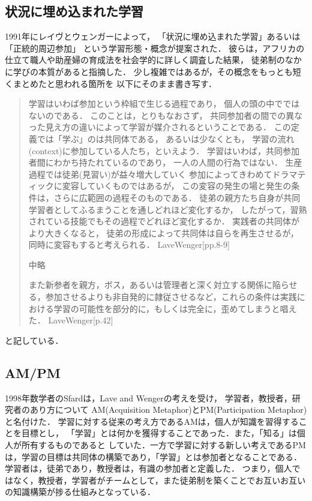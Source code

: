 \documentclass[a4,p11]{article}
\begin{document}
\subsection{状況に埋め込まれた学習}
\label{sec:org8be7648}
1991年にレイヴとウェンガーによって，
  「状況に埋め込まれた学習」あるいは「正統的周辺参加」
  という学習形態・概念が提案された．
  彼らは，アフリカの仕立て職人や助産婦の育成法を社会学的に詳しく調査した結果，
  徒弟制のなかに学びの本質があると指摘した．
少し複雑ではあるが，その概念をもっとも短くまとめたと思われる箇所を
以下にそのまま書き写す．
\begin{quote}
  学習はいわば参加という枠組で生じる過程であり，
  個人の頭の中でではないのである．
  このことは，とりもなおさず，
共同参加者の間での異なった見え方の違いによって学習が媒介されるということである．
この定義では「学ぶ」のは共同体である，
あるいは少なくとも，
学習の流れ(context)に参加している人たち，といえよう．
学習はいわば，共同参加者間にわかち持たれているのであり，
一人の人間の行為ではない．
生産過程では徒弟(見習い)が益々増大していく
参加によってきわめてドラマティックに変容していくものではあるが，
この変容の発生の場と発生の条件は，さらに広範囲の過程そのものである．
徒弟の親方たち自身が共同学習者としてふるまうことを通しどれほど変化するか，
したがって，習熟されている技能でもその過程でどれほど変化するか．
実践者の共同体がより大きくなると，
徒弟の形成によって共同体は自らを再生させるが，
同時に変容もすると考えられる．
LaveWenger[pp.8-9]

中略

また新参者を親方，ボス，あるいは管理者と深く対立する関係に陥らせる，参加させるよりも非自発的に隷従させるなど，これらの条件は実践における学習の可能性を部分的に，もしくは完全に，歪めてしまうと唱えた．
 LaveWenger[p.42]
\end{quote}
と記している．


\subsection{AM/PM}
\label{sec:org6b8494b}
1998年数学者のSfardは，Lave and Wengerの考えを受け，
学習者，教授者，研究者のあり方について
AM(Acquisition Metaphor)とPM(Participation Metaphor)と名付けた．
学習に対する従来の考え方であるAMは，個人が知識を習得することを目標とし，
「学習」とは何かを獲得することであった．また，「知る」は個人が所有するものであると
していた．一方で学習に対する新しい考えであるPMは，学習の目標は共同体の構築であり，「学習」とは参加者となることである．学習者は，徒弟であり，教授者は，有識の参加者と定義した．
つまり，個人ではなく，教授者，学習者がチームとして，また徒弟制を築くことでお互いお互いの知識構築が捗る仕組みとなっている．
\end{document}
